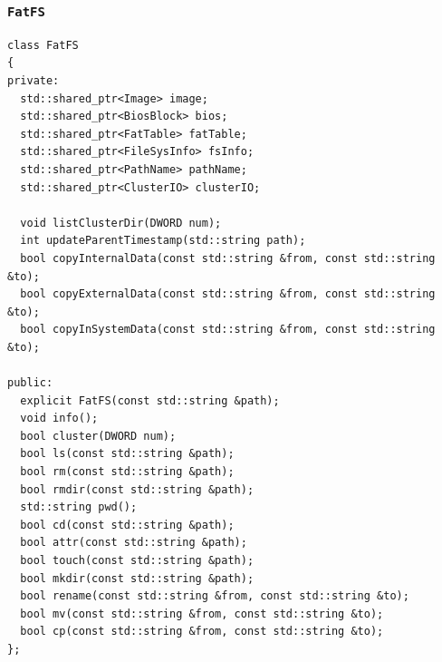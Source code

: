 \documentclass[
    12pt,				%
    oneside,   	        %
    a4paper,			%
    english,			%
    french,				%
    spanish,			%
    brazil,				%
    ]{pacotes/abntex2}
\begin{document}
\subsubsection{\texttt{FatFS}}
\label{subsubsec:fatfs}

\begin{lstlisting}[caption={Classe para manipulação do sistema de arquivos FAT}, label={lst:fatfs}]
class FatFS
{
private:
  std::shared_ptr<Image> image;
  std::shared_ptr<BiosBlock> bios;
  std::shared_ptr<FatTable> fatTable;
  std::shared_ptr<FileSysInfo> fsInfo;
  std::shared_ptr<PathName> pathName;
  std::shared_ptr<ClusterIO> clusterIO;

  void listClusterDir(DWORD num);
  int updateParentTimestamp(std::string path);
  bool copyInternalData(const std::string &from, const std::string &to);
  bool copyExternalData(const std::string &from, const std::string &to);
  bool copyInSystemData(const std::string &from, const std::string &to);

public:
  explicit FatFS(const std::string &path);
  void info();
  bool cluster(DWORD num);
  bool ls(const std::string &path);
  bool rm(const std::string &path);
  bool rmdir(const std::string &path);
  std::string pwd();
  bool cd(const std::string &path);
  bool attr(const std::string &path);
  bool touch(const std::string &path);
  bool mkdir(const std::string &path);
  bool rename(const std::string &from, const std::string &to);
  bool mv(const std::string &from, const std::string &to);
  bool cp(const std::string &from, const std::string &to);
};
\end{lstlisting}
\end{document}
